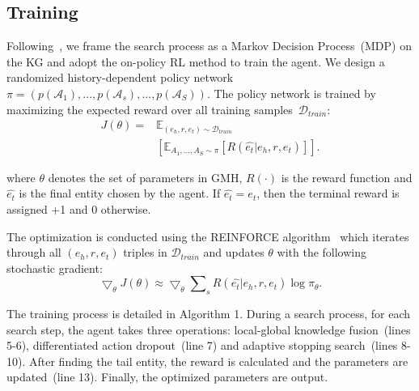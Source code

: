 \subsection{Training}
\label{sec:training}



Following~\cite{das2017go}, we frame the search process as a Markov Decision Process~(MDP) on the KG
and adopt the on-policy RL method to train the agent. 
We design a randomized history-dependent policy network $\pi=(p(\mathcal{A}_{1}),...,p(\mathcal{A}_{s}),...,p(\mathcal{A}_{S}))$.
The policy network is trained by maximizing the expected reward over all training samples~$\mathcal{D}_{train}$:
\begin{equation}
\begin{aligned}
J(\theta)=&\mathbb{E}_{(e_{h},r,e_{t})\sim \mathcal{D}_{train}}\\
&[\mathbb{E}_{A_{1},...,A_{S}\sim \pi}[R(\hat{e_{t}}|e_{h},r,e_{t})]].
\end{aligned}
\end{equation}

where $\theta$ denotes the set of parameters in GMH, $R(\cdot )$ is the reward function and $\hat{e_{t}}$ is the final entity chosen by the agent. If $\hat{e_{t}}={e}_{t}$, then the terminal reward is assigned +1 and 0 otherwise.

The optimization is conducted using the REINFORCE algorithm~\cite{reinforce1994} which iterates through all $(e_{h},r,e_{t})$ triples in $\mathcal{D}_{train}$ and updates $\theta $ with the following stochastic gradient:%
\begin{equation}
        \bigtriangledown _{\theta }J(\theta )\approx \bigtriangledown _{\theta }\sum\nolimits_{s}R(\hat{e_{t}}|e_{h},r,e_{t})\log \pi _{\theta }.
\label{eq:gradient}    
\end{equation}

The training process is detailed in Algorithm 1. 
During a search process, 
for each search step, the agent takes three operations: local-global knowledge fusion~(lines 5-6), differentiated action dropout~(line 7) and adaptive stopping search~(lines 8-10).
After finding the tail entity, the reward is calculated and the parameters are updated~(line 13).
Finally, the optimized parameters are output.


